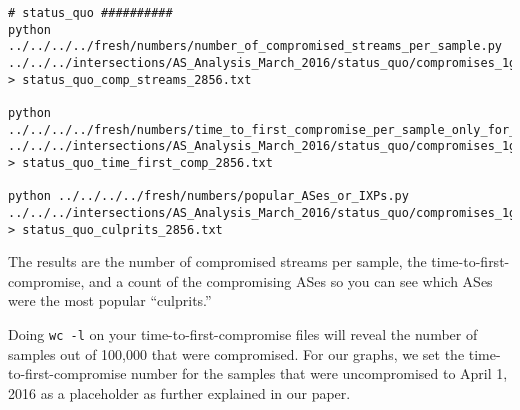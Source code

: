 \documentclass{article}
\begin{document}
\begin{lstlisting}
# status_quo ##########
python ../../../../fresh/numbers/number_of_compromised_streams_per_sample.py ../../../intersections/AS_Analysis_March_2016/status_quo/compromises_1guard_100K_2856.pickle > status_quo_comp_streams_2856.txt

python ../../../../fresh/numbers/time_to_first_compromise_per_sample_only_for_comp.py ../../../intersections/AS_Analysis_March_2016/status_quo/compromises_1guard_100K_2856.pickle > status_quo_time_first_comp_2856.txt

python ../../../../fresh/numbers/popular_ASes_or_IXPs.py ../../../intersections/AS_Analysis_March_2016/status_quo/compromises_1guard_100K_2856.pickle > status_quo_culprits_2856.txt
\end{lstlisting}

The results are 
the number of compromised streams per sample, the time-to-first-compromise, and a count 
of the compromising ASes so you can see which ASes were the most popular ``culprits.'' 

Doing {\tt wc -l} on your time-to-first-compromise files will reveal the number 
of samples out of 100,000 that were compromised. For our graphs, we set the 
time-to-first-compromise number for the samples that were uncompromised to 
April 1, 2016 as a placeholder as further explained in our paper.

\printbibliography
\end{document}
